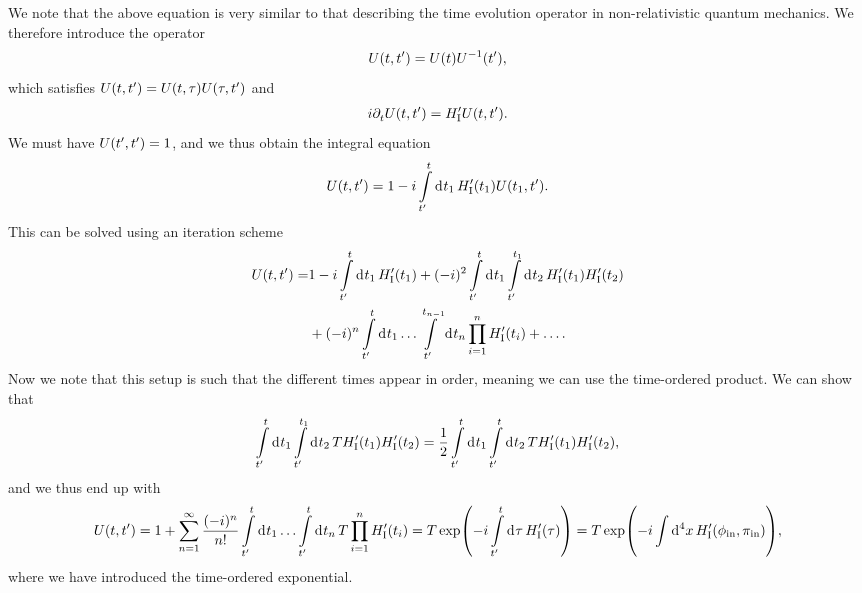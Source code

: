 We note that the above equation is very similar to that describing the time evolution operator in non-relativistic quantum mechanics. We therefore introduce the operator
\begin{align*}
	U(t, t^{\prime}) = U(t)U^{-1}(t^{\prime}),
\end{align*}
which satisfies $U(t, t^{\prime}) = U(t, \tau)U(\tau, t^{\prime})$ and
\begin{align*}
	i\partial^{}_{t}U(t, t^{\prime}) = H_{\text{I}}^{\prime} U(t, t^{\prime}).
\end{align*}
We must have $U(t^{\prime}, t^{\prime}) = 1$, and we thus obtain the integral equation
\begin{align*}
	U(t, t^{\prime}) = 1 -i\int\limits_{t^{\prime}}^{t}\dd[]{t_{1}}H_{\text{I}}^{\prime}(t_{1})U(t_{1}, t^{\prime}).
\end{align*}
This can be solved using an iteration scheme
\begin{align*}
	U(t, t\p) =& 1 -i\integ{t\p}{t}{t_{1}}{H_{\text{I}}\p(t_{1})} + (-i)^{2}\integ{t\p}{t}{t_{1}}{\integ{t\p}{t_{1}}{t_{2}}{H_{\text{I}}\p(t_{1})H_{\text{I}}\p(t_{2})}} \\
	           &+ (-i)^{n}\integ{t\p}{t}{t_{1}}{\dots\integ{t\p}{t_{n - 1}}{t_{n}}{\prod\limits_{i = 1}^{n}H_{\text{I}}\p(t_{i})}} + \dots.
\end{align*}
Now we note that this setup is such that the different times appear in order, meaning we can use the time-ordered product. We can show that
\begin{align*}
	\int\limits_{t^{\prime}}^{t}\dd[]{t_{1}}\int\limits_{t^{\prime}}^{t_{1}}\dd[]{t_{2}}T{H_{\text{I}}^{\prime}(t_{1})}{H_{\text{I}}^{\prime}(t_{2})} = \frac{1}{2}\int\limits_{t^{\prime}}^{t}\dd[]{t_{1}}\int\limits_{t^{\prime}}^{t}\dd[]{t_{2}}T{H_{\text{I}}^{\prime}(t_{1})}{H_{\text{I}}^{\prime}(t_{2})},
\end{align*}
and we thus end up with
\begin{align*}
	U(t, t\p) = 1 + \sum\limits_{n = 1}^{\infty}\frac{(-i)^{n}}{n!}\integ{t\p}{t}{t_{1}}{\dots\integ{t\p}{t}{t_{n}}{\torp\prod\limits_{i = 1}^{n}H_{\text{I}}\p(t_{i})}} = \torp\exp(-i\integ{t\p}{t}{\tau}{H_{\text{I}}\p(\tau)}) = \torp\exp(-i\integ[4]{}{}{x}{H_{\text{I}}\p(\phi_{\text{in}}, \pi_{\text{in}})}),
\end{align*}
where we have introduced the time-ordered exponential.

